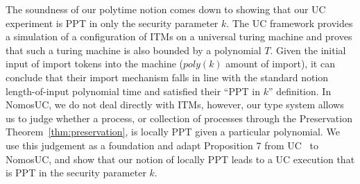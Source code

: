 

The soundness of our polytime notion comes down to showing that our UC experiment is PPT in only the security parameter $k$. 
The UC framework provides a simulation of a configuration of ITMs on a universal turing machine and proves that such a turing machine is also bounded by a polynomial $T$. 
Given the initial input of import tokens into the machine ($poly(k)$ amount of import), it can conclude that their import mechanism falls in line with the standard notion length-of-input polynomial time and satisfied their ``PPT in $k$'' definition. 
In NomosUC, we do not deal directly with ITMs, however, our type system allows us to judge whether a process, or collection of processes through the Preservation Theorem~\ref{thm:preservation}, is locally PPT given a particular polynomial. 
We use this judgement as a foundation and adapt Proposition 7 from UC~\cite{uc} to NomosUC, and show that our notion of locally PPT leads to a UC execution that is PPT in the security parameter $k$.

